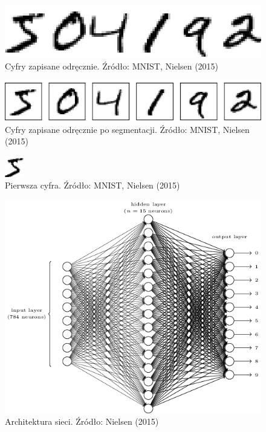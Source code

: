 \documentclass[10pt, oneside]{article}
\theoremstyle{remark}
\begin{document}
\begin{figure}[htpb]
	\centering
	\includegraphics[width=.5\linewidth]{figures/digits}
	\caption{Cyfry zapisane odręcznie. Źródło: MNIST, Nielsen (2015)}
\end{figure}
\begin{figure}[htpb]
	\centering
	\includegraphics[width=.5\linewidth]{figures/digits_separate}
	\caption{Cyfry zapisane odręcznie po segmentacji. Źródło: MNIST, Nielsen (2015)}
\end{figure}
\begin{figure}[htpb]
	\centering
	\includegraphics[width=.1\linewidth]{figures/mnist_first_digit}
	\caption{Pierwsza cyfra. Źródło: MNIST, Nielsen (2015)}
\end{figure}
\begin{figure}[!htpb]
	\centering
	\includegraphics[width=.5\linewidth]{figures/tikz12}
	\caption{Architektura sieci. Źródło: Nielsen (2015)}
\end{figure}
\end{document}
